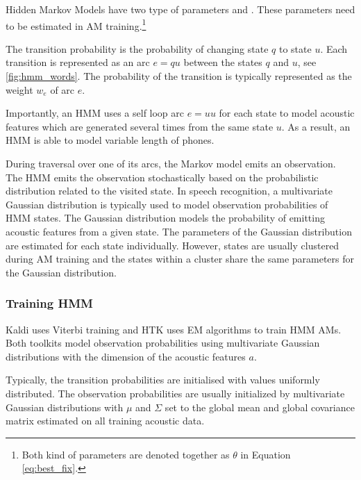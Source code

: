 Hidden Markov Models have two type of parameters  and . These parameters need to be estimated in \ac{AM} training.\footnote{Both kind of parameters are denoted together as $\theta$ in Equation \ref{eq:best_fix}.}

The transition probability is the probability of changing state $q$ to state $u$. Each transition is represented as an arc $e=qu$ between the states $q$ and $u$, see \ref{fig:hmm_words}. The probability of the transition is typically represented as the weight $w_e$ of arc $e$.

Importantly, an \ac{HMM} uses a self loop arc $e=uu$ for each state to model acoustic features which are generated several times from the same state $u$. As a result, an \ac{HMM} is able to model variable length of phones. %

During traversal over one of its arcs, the Markov model emits an observation. The \acl{HMM} emits the observation stochastically based on the probabilistic distribution related to the visited state. In speech recognition, a multivariate Gaussian distribution is typically used to model observation probabilities of \ac{HMM} states. The Gaussian distribution models the probability of emitting acoustic features from a given state. The parameters of the Gaussian distribution are estimated for each state individually. However, states are usually clustered during \ac{AM} training and the states within a cluster share the same parameters for the Gaussian distribution.


\subsubsection*{Training \ac{HMM}}
\label{sub:trainhmm}

Kaldi uses Viterbi training and \ac{HTK} uses \acl{EM} algorithms to train \ac{HMM} \acl{AM}s. Both toolkits model observation probabilities using multivariate Gaussian distributions with the dimension of the acoustic features $a$. %

Typically, the transition probabilities are initialised with values uniformly distributed. The observation probabilities are usually initialized by multivariate Gaussian distributions with $\mu$ and $\Sigma$ set to the global mean and global covariance matrix estimated on all training acoustic data.

